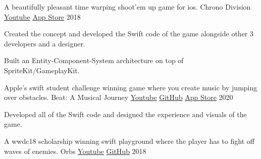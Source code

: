

\begin{cventries}
  \cventry
    {A beautifully pleasant time warping shoot'em up game for ios.}
    {Chrono Division}
    {\href{https://www.youtube.com/watch?v=Wc9-ALdmvRw}{Youtube} \hspace{4pt} \href{https://itunes.apple.com/app/id1437675179}{App Store}}
    {2018}
    {
      \begin{cvitems}
        \item {Created the concept and developed the Swift code of the game alongside other 3 developers and a designer.}
        \item {Built an Entity-Component-System architecture on top of SpriteKit/GameplayKit.}
      \end{cvitems}
    }
  \cventry
    {Apple's swift student challenge winning game where you create music by jumping over obstacles.}
    {Beat: A Musical Journey}
    {\href{https://www.youtube.com/watch?v=ayVB08sXtZY}{Youtube} \hspace{4pt} \href{https://github.com/renanmagagnin/beat-wwdc20}{GitHub} \hspace{4pt} \href{https://apps.apple.com/br/app/beat-a-musical-journey/id1514160330}{App Store}}
    {2020}
    {
      \begin{cvitems}
        \item {Developed all of the Swift code and designed the experience and visuals of the game.}
      \end{cvitems}
    }
  \cventry
    {A wwdc18 scholarship winning swift playground where the player has to fight off waves of enemies.}
    {Orbs}
    {\href{https://www.youtube.com/watch?v=W-tzS0x1SiA}{Youtube} \hspace{4pt} \href{https://github.com/renanmagagnin/orbs-wwdc18}{GitHub}}
    {2018}
    {
      \begin{cvitems}

\end{cvitems}}
\end{cventries}
